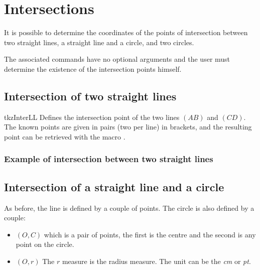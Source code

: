 \section{Intersections}

It is possible to determine the coordinates of the points of intersection between two straight lines, a straight line and a circle, and two circles.

The associated commands have no optional arguments and the user must determine the existence of the intersection points himself.

\subsection{Intersection of two straight lines}
\begin{NewMacroBox}{tkzInterLL}{}%
Defines the intersection point  of the two lines $(AB)$ and $(CD)$. The known points are given in pairs (two per line) in brackets, and the resulting point can be retrieved with the macro .
\end{NewMacroBox}

\subsubsection{Example of intersection between two straight lines}

\begin{tkzexample}[latex=7cm,small]
\end{tkzexample}

\subsection{Intersection of a straight line and a circle}

As before, the line is defined by a couple of points. The circle
 is also defined by a couple:
\begin{itemize}
\item $(O,C)$ which is a pair of points, the first is the centre and the second is any point on the circle.
\item $(O,r)$  The $r$ measure is the radius measure. The unit can be the \emph{cm} or \emph{pt}.
\end{itemize}

